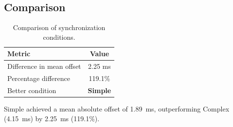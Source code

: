 \subsection*{Comparison}

\begin{table}[h!]
\centering
\begin{tabular}{|l|c|}
\hline
Metric & Value \\
\hline
Difference in mean offset & 2.25 ms \\
Percentage difference & 119.1\% \\
Better condition & \textbf{Simple} \\
\hline
\end{tabular}
\caption{Comparison of synchronization conditions.}
\label{tab:sync_comparison}
\end{table}

Simple achieved a mean absolute offset of 1.89~ms, outperforming Complex (4.15~ms) by 2.25~ms (119.1\%).
